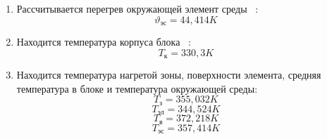 \begin{enumerate}[label={\arabic*.}]
\item Рассчитывается перегрев окружающей элемент среды ~\cite{Rotkop1976}:
  $$\vartheta\mathrm{_{эс}} = 44,414K $$
  
\item Находится температура корпуса блока ~\cite{Rotkop1976}:
  $$T\mathrm{_{к}} = 330,3 K$$
\item Находится температура нагретой зоны, поверхности элемента,
    средняя температура в блоке и температура окружающей среды:
    $$T\mathrm{_з} = 355,032 K$$
    $$T\mathrm{_{эл}} = 344,524 K$$
    $$T\mathrm{_{в}} = 372,218 K$$
    $$T\mathrm{_{эс}} =357,414 K$$

    
\end{enumerate}